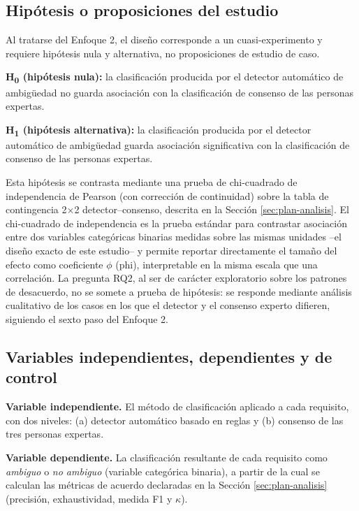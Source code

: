 \documentclass[journal,onecolumn]{IEEEtran}
\begin{document}
	\subsection{Hipótesis o proposiciones del estudio}
	\label{sec:hipotesis}
	
	Al tratarse del Enfoque 2, el diseño corresponde a un cuasi-experimento y
	requiere hipótesis nula y alternativa, no proposiciones de estudio de caso.
	
	\textbf{H\textsubscript{0} (hipótesis nula):} la clasificación producida
	por el detector automático de ambigüedad no guarda asociación con la
	clasificación de consenso de las personas expertas.
	
	\textbf{H\textsubscript{1} (hipótesis alternativa):} la clasificación
	producida por el detector automático de ambigüedad guarda asociación
	significativa con la clasificación de consenso de las personas expertas.
	
	Esta hipótesis se contrasta mediante una prueba de chi-cuadrado de
	independencia de Pearson (con corrección de continuidad) sobre la tabla
	de contingencia 2$\times$2 detector--consenso, descrita en la Sección
	\ref{sec:plan-analisis}. El chi-cuadrado de independencia es la prueba
	estándar para contrastar asociación entre dos variables categóricas
	binarias medidas sobre las mismas unidades --el diseño exacto de este
	estudio-- y permite reportar directamente el tamaño del efecto como
	coeficiente $\phi$ (phi), interpretable en la misma escala que una
	correlación. La pregunta RQ2, al ser de carácter exploratorio sobre los
	patrones de desacuerdo, no se somete a prueba de hipótesis: se responde
	mediante análisis cualitativo de los casos en los que el detector y el
	consenso experto difieren, siguiendo el sexto paso del Enfoque 2.
	
	\subsection{Variables independientes, dependientes y de control}
	\label{sec:variables}
	
	\textbf{Variable independiente.} El método de clasificación aplicado a
	cada requisito, con dos niveles: (a) detector automático basado en reglas
	y (b) consenso de las tres personas expertas.
	
	\textbf{Variable dependiente.} La clasificación resultante de cada
	requisito como \emph{ambiguo} o \emph{no ambiguo} (variable categórica
	binaria), a partir de la cual se calculan las métricas de acuerdo
	declaradas en la Sección \ref{sec:plan-analisis} (precisión, exhaustividad,
	medida F1 y $\kappa$).
	
\end{document}
